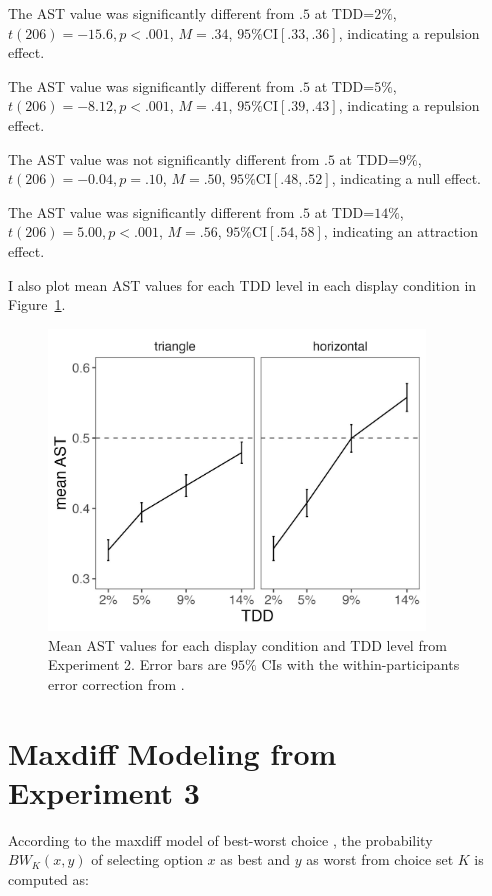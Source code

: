 The AST value was significantly different from $.5$ at TDD=$2\%$, $\textit{t}(206)=-15.6,\textit{p}<.001$, $\textit{M}=.34$, $95\%\text{CI}[.33,.36]$, indicating a repulsion effect. 

The AST value was significantly different from $.5$ at TDD=$5\%$, $\textit{t}(206)=-8.12,\textit{p}<.001$, $\textit{M}=.41$, $95\%\text{CI}[.39,.43]$, indicating a repulsion effect. 

The AST value was not significantly different from $.5$ at TDD=$9\%$, $\textit{t}(206)=-0.04,\textit{p}=.10$, $\textit{M}=.50$, $95\%\text{CI}[.48,.52]$, indicating a null effect. 

The AST value was significantly different from $.5$ at TDD=$14\%$, $\textit{t}(206)=5.00,\textit{p}<.001$, $\textit{M}=.56$, $95\%\text{CI}[.54,58]$, indicating an attraction effect. 

I also plot mean AST values for each TDD level in each display condition in Figure~\ref{fig:e2_ast}.

\begin{figure}
   \includegraphics[width=100mm]{figures/choicePhase_mean_ast.jpeg}
   \caption{Mean AST values for each display condition and TDD level from Experiment 2. Error bars are $95\%$ CIs with the within-participants error correction from \textcite{cousineau2014error}.}
   \label{fig:e2_ast}
\end{figure}

\chapter{Maxdiff Modeling from Experiment 3}
According to the maxdiff model of best-worst choice \parencite{marleyProbabilisticModelsBest2005}, the probability $BW_{K}(x,y)$ of selecting option $x$ as best and $y$ as worst from choice set $K$ is computed as:

